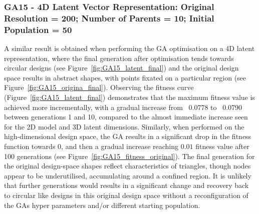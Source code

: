 \documentclass{article}
\begin{document}
\subsubsection*{GA15 - 4D Latent Vector Representation: Original Resolution = 200; Number of Parents = 10; Initial Population = 50}

A similar result is obtained when performing the GA optimisation on a 4D latent representation, where the final generation after optimisation tends towards circular designs (see Figure~\ref{fig:GA15_latent_final}) and the original design space results in abstract shapes, with points fixated on a particular region (see Figure~\ref{fig:GA15_origina_final}).
Observing the fitness curve (Figure~\ref{fig:GA15_latent_final}) demonstrates that the maximum fitness value is achieved more incrementally, with a gradual increase from ~0.0778 to ~0.0790 between generations 1 and 10, compared to the almost immediate increase seen for the 2D model and 3D latent dimensions. Similarly, when performed on the high-dimensional design space, the GA results in a significant drop in the fitness function towards 0, and then a gradual increase reaching $0.01$ fitness value after 100 generations (see Figure~\ref{fig:GA15_fitness_original}). The final generation for the original design-space shapes reflect characteristics of triangles, though nodes appear to be underutilised, accumulating around a confined region. It is unlikely that further generations would results in a significant change and recovery back to circular like designs in this original design space without a reconfiguration of the GAs hyper parameters and/or different starting population.
\end{document}
